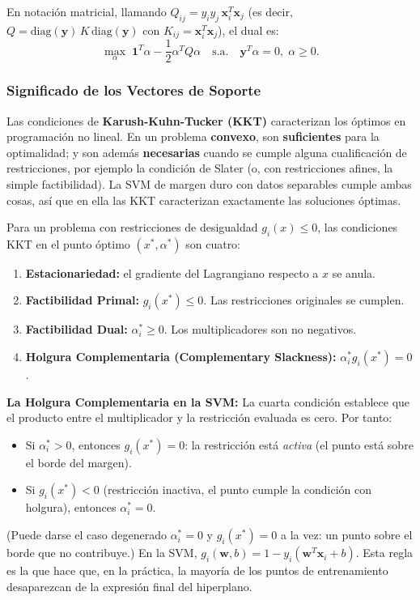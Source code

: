 \documentclass[12pt, a4paper]{article}
\begin{document}
\noindent En notación matricial, llamando $Q_{ij} = y_i y_j \, \mathbf{x}_i^T \mathbf{x}_j$ (es decir, $Q = \mathrm{diag}(\mathbf{y})\, K\, \mathrm{diag}(\mathbf{y})$ con $K_{ij} = \mathbf{x}_i^T\mathbf{x}_j$), el dual es:
\[ \max_{\alpha} \; \mathbf{1}^T \alpha - \frac{1}{2}\alpha^T Q \alpha \quad \text{s.a.} \quad \mathbf{y}^T\alpha = 0, \; \alpha \geq 0. \]

\subsubsection{Significado de los Vectores de Soporte}

\begin{tcolorbox}[colback=teal!5!white,colframe=teal!75!black,title=\textbf{Nota Teórica: Condiciones KKT y Holgura Complementaria}]
Las condiciones de \textbf{Karush-Kuhn-Tucker (KKT)} \cite{boyd2004convex} caracterizan los óptimos en programación no lineal. En un problema \textbf{convexo}, son \textbf{suficientes} para la optimalidad; y son además \textbf{necesarias} cuando se cumple alguna cualificación de restricciones, por ejemplo la condición de Slater (o, con restricciones afines, la simple factibilidad). La SVM de margen duro con datos separables cumple ambas cosas, así que en ella las KKT caracterizan exactamente las soluciones óptimas.

Para un problema con restricciones de desigualdad $g_i(x) \leq 0$, las condiciones KKT en el punto óptimo $(x^*, \alpha^*)$ son cuatro:
\begin{enumerate}
    \item \textbf{Estacionariedad:} el gradiente del Lagrangiano respecto a $x$ se anula.
    \item \textbf{Factibilidad Primal:} $g_i(x^*) \leq 0$. Las restricciones originales se cumplen.
    \item \textbf{Factibilidad Dual:} $\alpha_i^* \geq 0$. Los multiplicadores son no negativos.
    \item \textbf{Holgura Complementaria (Complementary Slackness):} $\alpha_i^* g_i(x^*) = 0$.
\end{enumerate}

\textbf{La Holgura Complementaria en la SVM:}
La cuarta condición establece que el producto entre el multiplicador y la restricción evaluada es cero. Por tanto:
\begin{itemize}
    \item Si $\alpha_i^* > 0$, entonces $g_i(x^*) = 0$: la restricción está \textit{activa} (el punto está sobre el borde del margen).
    \item Si $g_i(x^*) < 0$ (restricción inactiva, el punto cumple la condición con holgura), entonces $\alpha_i^* = 0$.
\end{itemize}
(Puede darse el caso degenerado $\alpha_i^* = 0$ y $g_i(x^*) = 0$ a la vez: un punto sobre el borde que no contribuye.) En la SVM, $g_i(\mathbf{w}, b) = 1 - y_i(\mathbf{w}^T \mathbf{x}_i + b)$. Esta regla es la que hace que, en la práctica, la mayoría de los puntos de entrenamiento desaparezcan de la expresión final del hiperplano.
\end{tcolorbox}
\end{document}
